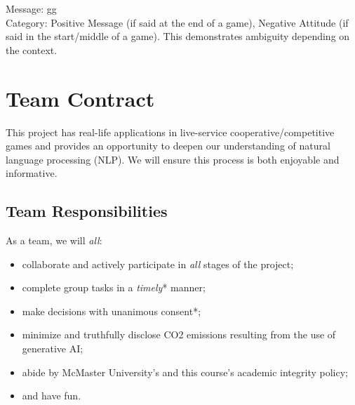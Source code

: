 \documentclass[11pt, letterpaper, notitlepage]{article}
\begin{document}
Message: gg\\
Category: Positive Message (if said at the end of a game), Negative Attitude (if said in the start/middle of a game). This demonstrates ambiguity depending on the context.


\newpage

\section[2]{Team Contract}


This project has real-life applications in live-service cooperative/competitive games and provides an opportunity to deepen our understanding of natural language processing (NLP). We will ensure this process is both enjoyable and informative.

\subsection{Team Responsibilities}


As a team, we will \textit{all}:
\begin{itemize}[noitemsep, nolistsep]
    \item collaborate and actively participate in \textit{all} stages of the project;
    \item complete group tasks in a \textit{timely}* manner;
    \item make decisions with unanimous consent*;
    \item minimize and truthfully disclose CO2 emissions resulting from the use of generative AI;
    \item abide by McMaster University's and this course's academic integrity policy;
    \item and have fun.
\end{itemize}
\end{document}
